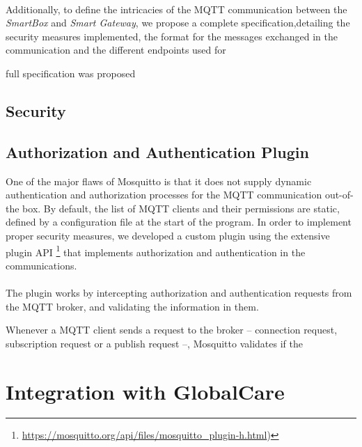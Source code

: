 \paragraph{} Additionally, to define the intricacies of the \acs{MQTT} communication between the \textit{SmartBox} and \textit{Smart Gateway}, we propose a complete specification,detailing the security measures implemented, the format for the messages exchanged in the communication and the different endpoints used for 

full specification was proposed 

\subsection{Security}


\subsection{Authorization and Authentication Plugin}

One of the major flaws of Mosquitto is that it does not supply dynamic authentication and authorization processes for the \acs{MQTT} communication out-of-the box. By default, the list of \acs{MQTT} clients and their permissions are static, defined by a configuration file at the start of the program. In order to implement proper security measures, we developed a custom plugin using the extensive plugin \acs{API} \footnote{\url{https://mosquitto.org/api/files/mosquitto_plugin-h.html})} that implements authorization and authentication in the communications.

\paragraph{} The plugin works by intercepting authorization and authentication requests from the \acs{MQTT} broker, and validating the information in them. 

Whenever a \acs{MQTT} client sends a request to the broker -- connection request, subscription request or a publish request --, Mosquitto validates if the 



\section{Integration with GlobalCare}

